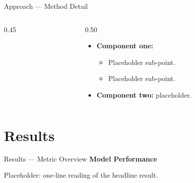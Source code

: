 \begin{frame}{Approach --- Method Detail}
  \begin{columns}[c]
    \begin{column}{0.45\textwidth}\centering
    \end{column}
    \begin{column}{0.50\textwidth}
      \begin{large}
        \begin{itemize}\setlength{\itemsep}{1.2em}
          \item \textbf{Component one:}
          \begin{itemize}\setlength{\itemsep}{0.6em}
            \item Placeholder sub-point.
            \item Placeholder sub-point.
          \end{itemize}
          \item \textbf{Component two:} placeholder.
        \end{itemize}
      \end{large}
    \end{column}
  \end{columns}
\end{frame}

\section{Results}

\begin{frame}{Results --- Metric Overview}
  \centering
  {\small\Raleway\bfseries\color{aggieblue} Model Performance}\\[0.3em]
  \vspace{0.8em}

  \color{coolgray}
  Placeholder: one-line reading of the headline result.
\end{frame}

